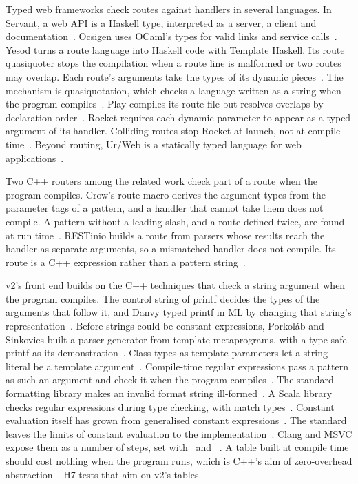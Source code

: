 Typed web frameworks check routes against handlers in several languages. In Servant, a web API is a
Haskell type, interpreted as a server, a client and documentation~\cite{mestanogullari2015servant}.
Ocsigen uses OCaml's types for valid links and service calls~\cite{balat2006ocsigen}. Yesod turns a
route language into Haskell code with Template Haskell. Its route quasiquoter stops the compilation
when a route line is malformed or two routes may overlap. Each route's arguments take the types of
its dynamic pieces~\cite{yesod2026routing,yesod2025core}. The mechanism is quasiquotation, which checks a
language written as a string when the program compiles~\cite{mainland2007quasiquoting}. Play
compiles its route file but resolves overlaps by declaration order~\cite{play2026routing}. Rocket
requires each dynamic parameter to appear as a typed argument of its handler. Colliding routes stop
Rocket at launch, not at compile time~\cite{rocket2024rocket}. Beyond routing, Ur/Web is a statically
typed language for web applications~\cite{chlipala2015urweb}.

Two C++ routers among the related work check part of a route when the program compiles. Crow's
route macro derives the argument types from the parameter tags of a pattern, and a handler that
cannot take them does not compile. A pattern without a leading slash, and a route defined twice, are
found at run time~\cite{crow2026routing}. RESTinio builds a route from parsers whose results reach
the handler as separate arguments, so a mismatched handler does not compile. Its route is a C++
expression rather than a pattern string~\cite{stiffstream2025restinio}.

v2's front end builds on the C++ techniques that check a string argument when the program compiles.
The control string of printf decides the types of the arguments that follow it, and Danvy typed
printf in ML by changing that string's representation~\cite{danvy1998unparsing}. Before strings could be constant expressions, Porkol\'ab and Sinkovics
built a parser generator from template metaprograms, with a type-safe printf as its
demonstration~\cite{porkolab2010dsl}. Class types as template parameters let a string literal be a
template argument~\cite{snyder2018p0732}. Compile-time regular expressions pass a pattern as such an
argument and check it when the program compiles~\cite{dusikova2019p1433,dusikova2026ctre}. The
standard formatting library makes an invalid format string
ill-formed~\cite{zverovich2021p2216,zverovich2026fmt}. A Scala library checks regular expressions
during type checking, with match types~\cite{blanvillain2022regex}. Constant evaluation itself has grown from generalised constant
expressions~\cite{dosreis2010constexpr,stroustrup2020hopl}. The standard leaves the limits of constant evaluation to the
implementation~\cite{smith2020n4861}. Clang and MSVC expose them as a number of steps, set with
\ClangSteps\ and \MsvcSteps~\cite{llvm2026clangmanual,microsoft2026constexpr}. A table built at compile
time should cost nothing when the program runs, which is C++'s aim of zero-overhead
abstraction~\cite{stroustrup2012foundations}. H7 tests that aim on v2's tables.


